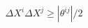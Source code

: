 \begin{equation}
\Delta X^{i}\Delta X^{j}\geq\left|  \theta^{ij}\right|  /2\label{31}%
\end{equation}

